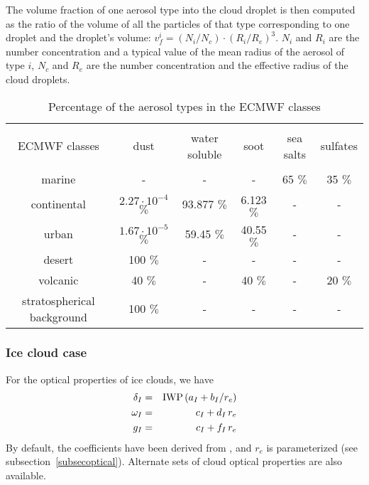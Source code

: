 The volume fraction of one aerosol type into the cloud droplet is then computed as the ratio of the volume of all the particles of that type corresponding to one droplet and the droplet's volume: $v_f^i=(N_i/N_c)\cdot (R_i/R_e)^3$. $N_i$ and $R_i$ are the number concentration and a typical value of the mean radius of the aerosol of type $i$, $N_c$ and $R_e$ are the number concentration and the effective radius of the cloud droplets. 

\bigskip

\begin{table}[!ht]
\caption{Percentage of the aerosol types in the ECMWF classes \citep{dAlmeida1991}}
\begin{center}
\begin{tabular}{|c|c|c|c|c|c|}
   \hline
     &   &   &  &  &    \\
      ECMWF classes & dust & water soluble & soot & sea salts & sulfates  \\
     &   &   &  &  &    \\
   \hline
   \hline
marine & -  &  -   &  -   &  65 $\%$   & 35  $\%$        \\
  \hline
continental & $2.27\cdot 10^{-4}$  $\%$  & 93.877 $\%$    &  6.123  $\%$   & -   & -    \\
  \hline
urban & $1.67\cdot 10^{-5}$ $\%$   & 59.45  $\%$   &  40.55  $\%$   & -   & -    \\
  \hline
desert & 100  $\%$  & -   &  -   & -   & -    \\
  \hline
volcanic & 40  $\%$  & -   &  40  $\%$   & -   & 20  $\%$    \\
  \hline
stratospherical background & 100  $\%$  & -   &  -   & -   & -    \\
  \hline
\end{tabular} 
\end{center}
\end{table} 
\bigskip


%
\subsubsection{Ice cloud case}
%
For the optical properties of ice clouds, we have
\begin{eqnarray}
\delta_{I} &=& {\rm IWP}\, (a_{I} + b_{I} / r_{e} )\cr
\omega_{I} &=& c_{I}  + d_{I}\, r_{e} \cr
g_I        &=& c_{I} + f_{I}\,r_{e}
\end{eqnarray}
By default,  the coefficients have been derived from \citet{Ebert1992},
and $r_{e}$ is parameterized (see subsection~\ref{subsecoptical}).
Alternate sets of cloud optical properties are also available.

